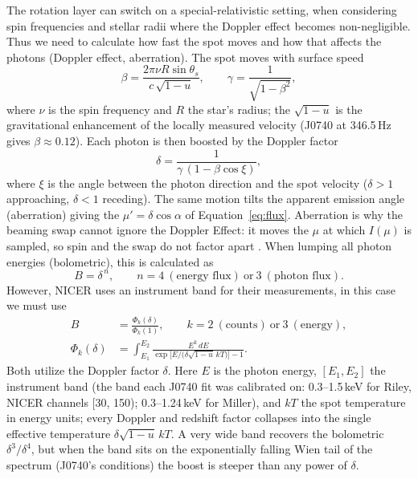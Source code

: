 \documentclass[twocolumn]{aastex701}
\begin{document}
The rotation layer can switch on a special-relativistic setting, when considering spin
frequencies and stellar radii where the Doppler effect becomes non-negligible. Thus we need
to calculate how fast the spot moves and how that affects the photons (Doppler effect,
aberration).
The spot moves with surface speed
\begin{equation}
\beta = \frac{2\pi\nu R \sin\theta_s}{c\,\sqrt{1-u}}, \qquad \gamma =
    \frac{1}{\sqrt{1-\beta^2}}, \label{eq:speed}
\end{equation}
where $\nu$ is the spin frequency and $R$ the star's radius; the $\sqrt{1-u}$ is the
gravitational enhancement of the locally measured velocity (J0740 at 346.5\,Hz gives $\beta
\approx 0.12$). Each photon is then boosted by the Doppler factor
\begin{equation}
    \delta = \frac{1}{\gamma\,(1 - \beta\cos\xi)}, \label{eq:doppler}
\end{equation}
where $\xi$ is the angle between the photon direction and the spot velocity ($\delta > 1$
approaching, $\delta < 1$ receding). The same motion tilts the apparent emission angle
(aberration) giving the $\mu' = \delta\cos\alpha$ of Equation~\eqref{eq:flux}. Aberration is
why the beaming swap cannot ignore the Doppler Effect: it moves the $\mu$ at which $I(\mu)$
is sampled, so spin and the swap do not factor apart \citep{Bogdanov2019}.
When lumping all photon energies (bolometric), this is calculated as
\begin{equation}
B = \delta^{\,n}, \qquad n = 4\ (\text{energy flux})\ \text{or}\ 3\ (\text{photon flux}).
    \label{eq:boost}
\end{equation}
However, NICER uses an instrument band for their measurements, in this case we must use
\begin{align}
B &= \frac{\Phi_k(\delta)}{\Phi_k(1)}, \qquad k = 2\ (\text{counts})\ \text{or}\ 3\
    (\text{energy}), \nonumber \\
\Phi_k(\delta) &= \int_{E_1}^{E_2} \frac{E^k\, dE}{\exp\big[E / \big(\delta\sqrt{1-u}\,
    kT\big)\big] - 1}. \label{eq:bandboost}
\end{align}
Both utilize the Doppler factor $\delta$.
{Here $E$ is the photon energy, $[E_1, E_2]$ the instrument band (the band each J0740 fit
was calibrated on: 0.3--1.5\,keV for Riley, NICER channels [30, 150); 0.3--1.24\,keV for
Miller), and $kT$ the spot temperature in energy units; every Doppler and redshift factor
collapses into the single effective temperature $\delta\sqrt{1-u}\,kT$. A very wide band
recovers the bolometric $\delta^{3}/\delta^{4}$, but when the band sits on the exponentially
falling Wien tail of the spectrum (J0740's conditions) the boost is steeper than any power
of $\delta$.}
\end{document}
